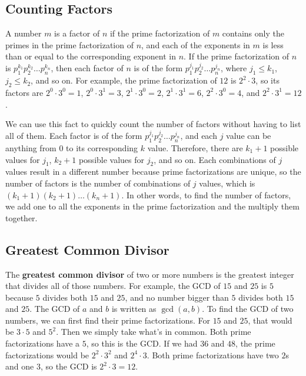 \documentclass{article}
\begin{document}
\begin{multicols}{2}
	\subsection*{Counting Factors}
	A number $m$ is a factor of $n$ if the prime factorization of $m$ contains only the primes
	in the prime factorization of $n$, and each of the exponents in $m$ is less than or equal to
	the corresponding exponent in $n$.
	If the prime factorization of $n$ is $p_1^{k_1} p_2^{k_2} \dots p_n^{k_n}$,
	then each factor of $n$ is of the form $p_1^{j_1} p_2^{j_2} \dots p_n^{j_n}$,
	where $j_1 \leq k_1$, $j_2 \leq k_2$, and so on.
	For example, the prime factorization of $12$ is $2^2 \cdot 3$, so its factors are
	$2^0 \cdot 3^0 = 1$, $2^0 \cdot 3^1 = 3$, $2^1 \cdot 3^0 = 2$, $2^1 \cdot 3^1 = 6$,
	$2^2 \cdot 3^0 = 4$, and $2^2 \cdot 3^1 = 12$.
	
	We can use this fact to quickly count the number of factors without having to list all of them.
	Each factor is of the form $p_1^{j_1} p_2^{j_2} \dots p_n^{j_n}$, and each $j$ value
	can be anything from $0$ to its corresponding $k$ value.
	Therefore, there are $k_1 + 1$ possible values for $j_1$, $k_2 + 1$ possible values for $j_2$,
	and so on.
	Each combinations of $j$ values result in a different number because prime factorizations
	are unique, so the number of factors is the number of combinations of $j$ values,
	which is $(k_1 + 1)(k_2 + 1) \dots (k_n + 1)$.
	In other words, to find the number of factors, we add one to all the exponents in the
	prime factorization and the multiply them together.
	
	\subsection*{Greatest Common Divisor}
	The \textbf{greatest common divisor} of two or more numbers is the greatest integer that
	divides all of those numbers.
	For example, the GCD of $15$ and $25$ is $5$ because $5$ divides both $15$ and $25$,
	and no number bigger than $5$ divides both $15$ and $25$.
	The GCD of $a$ and $b$ is written as $\gcd(a, b)$.
	To find the GCD of two numbers, we can first find their prime factorizations.
	For $15$ and $25$, that would be $3 \cdot 5$ and $5^2$.
	Then we simply take what's in common.
	Both prime factorizations have a $5$, so this is the GCD.
	If we had $36$ and $48$, the prime factorizations would be $2^2 \cdot 3^2$ and $2^4 \cdot 3$.
	Both prime factorizations have two $2$s and one $3$, so the GCD is $2^2 \cdot 3 = 12$.
	

\end{multicols}
\end{document}
